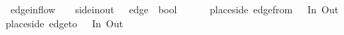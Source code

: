 \ edge{\isacharunderscore}in{\isacharunderscore}flow\ {\isacharcolon}{\isacharcolon}\ {\isachardoublequoteopen}{\isacharparenleft}\ {\isacharcolon}{\isacharcolon}\ side{\isacharunderscore}in{\isacharunderscore}out{\isacharcomma}\ \ \ edge\ {\isasymRightarrow}\ bool{\isachardoublequoteclose}\isanewline
\ \ \ {\isachardoublequoteopen}\ \ {\isacharequal}\ {\isacharparenleft}place{\isacharunderscore}side\ {\isacharparenleft}edge{\isacharunderscore}from\ \ {\isasymin}\ {\isacharbraceleft}In{\isacharcomma}\ Out{\isacharbraceright}\ {\isasymor}\isanewline
{}place{\isacharunderscore}side\ {\isacharparenleft}edge{\isacharunderscore}to\ \ {\isasymin}\ {\isacharbraceleft}In{\isacharcomma}\ Out{\isacharbraceright}{\isacharparenright}{\isachardoublequoteclose}
